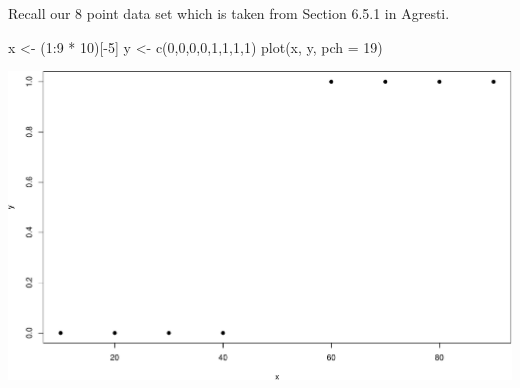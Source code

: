\documentclass[
  ignorenonframetext,
]{beamer}
\newenvironment{Shaded}{\begin{snugshade}}{\end{snugshade}}
\newcommand{\AttributeTok}[1]{\textcolor[rgb]{0.77,0.63,0.00}{#1}}
\newcommand{\DecValTok}[1]{\textcolor[rgb]{0.00,0.00,0.81}{#1}}
\newcommand{\FunctionTok}[1]{\textcolor[rgb]{0.00,0.00,0.00}{#1}}
\newcommand{\NormalTok}[1]{#1}
\newcommand{\OtherTok}[1]{\textcolor[rgb]{0.56,0.35,0.01}{#1}}
\newcommand{\SpecialCharTok}[1]{\textcolor[rgb]{0.00,0.00,0.00}{#1}}
\begin{document}
\begin{frame}[fragile]{}
\protect\hypertarget{section}{}
Recall our 8 point data set which is taken from Section 6.5.1 in
Agresti.

\vspace{12pt}
\tiny

\begin{Shaded}
\begin{Highlighting}[]
\NormalTok{x }\OtherTok{\textless{}{-}}\NormalTok{ (}\DecValTok{1}\SpecialCharTok{:}\DecValTok{9} \SpecialCharTok{*} \DecValTok{10}\NormalTok{)[}\SpecialCharTok{{-}}\DecValTok{5}\NormalTok{]}
\NormalTok{y }\OtherTok{\textless{}{-}} \FunctionTok{c}\NormalTok{(}\DecValTok{0}\NormalTok{,}\DecValTok{0}\NormalTok{,}\DecValTok{0}\NormalTok{,}\DecValTok{0}\NormalTok{,}\DecValTok{1}\NormalTok{,}\DecValTok{1}\NormalTok{,}\DecValTok{1}\NormalTok{,}\DecValTok{1}\NormalTok{)}
\FunctionTok{plot}\NormalTok{(x, y, }\AttributeTok{pch =} \DecValTok{19}\NormalTok{)}
\end{Highlighting}
\end{Shaded}

\includegraphics{week7_p2_files/figure-beamer/unnamed-chunk-1-1.pdf}
\end{frame}
\end{document}
